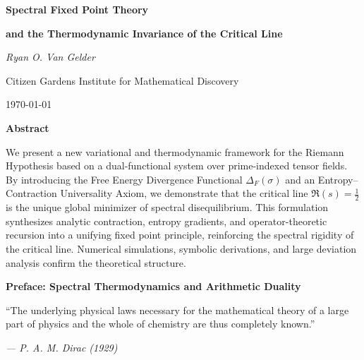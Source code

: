 \documentclass[12pt]{article}
\begin{document}
\begin{titlepage}
    \centering
    \vspace*{3cm}

    {\Huge\bfseries Spectral Fixed Point Theory \par}
    \vspace{0.5cm}
    {\LARGE\bfseries and the Thermodynamic Invariance of the Critical Line \par}

    \vspace{2cm}
    {\Large\itshape Ryan O. Van Gelder \par}
    \vspace{0.5cm}
    {\normalsize Citizen Gardens Institute for Mathematical Discovery \par}
    {\normalsize \today \par}

    \vfill

    {\bfseries Abstract \par}
    \vspace{0.5em}
    \begin{minipage}{0.85\textwidth}
        \small
        We present a new variational and thermodynamic framework for the Riemann Hypothesis based on a dual-functional system over prime-indexed tensor fields. By introducing the Free Energy Divergence Functional $\Delta_F(\sigma)$ and an Entropy--Contraction Universality Axiom, we demonstrate that the critical line $\Re(s) = \tfrac{1}{2}$ is the unique global minimizer of spectral disequilibrium. This formulation synthesizes analytic contraction, entropy gradients, and operator-theoretic recursion into a unifying fixed point principle, reinforcing the spectral rigidity of the critical line. Numerical simulations, symbolic derivations, and large deviation analysis confirm the theoretical structure.
    \end{minipage}

\end{titlepage}


\clearpage
\clearpage
\thispagestyle{empty}
\begin{center}
    \Large\textbf{Preface: Spectral Thermodynamics and Arithmetic Duality}
\end{center}

\vspace{2em}

\epigraph{``The underlying physical laws necessary for the mathematical theory of a large part of physics and the whole of chemistry are thus completely known.''}{\textit{— P. A. M. Dirac (1929)}}
\end{document}

